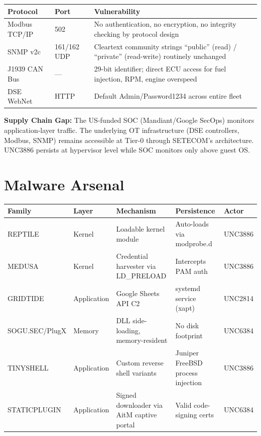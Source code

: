 \documentclass[11pt,a4paper]{article}
\begin{document}
\begin{tabularx}{\textwidth}{llX}
\toprule
\textbf{Protocol} & \textbf{Port} & \textbf{Vulnerability} \\
\midrule
Modbus TCP/IP & 502 & No authentication, no encryption, no integrity checking by protocol design \\
SNMP v2c & 161/162 UDP & Cleartext community strings ``public'' (read) / ``private'' (read-write) routinely unchanged \\
J1939 CAN Bus & — & 29-bit identifier; direct ECU access for fuel injection, RPM, engine overspeed \\
DSE WebNet & HTTP & Default Admin/Password1234 across entire fleet \\
\bottomrule
\end{tabularx}

\vspace{0.5em}
\textbf{Supply Chain Gap:} The US-funded SOC (Mandiant/Google SecOps) monitors application-layer traffic. The underlying OT infrastructure (DSE controllers, Modbus, SNMP) remains accessible at Tier-0 through SETECOM's architecture. UNC3886 persists at hypervisor level while SOC monitors only above guest OS.

\section{Malware Arsenal}

\begin{tabularx}{\textwidth}{llXXl}
\toprule
\textbf{Family} & \textbf{Layer} & \textbf{Mechanism} & \textbf{Persistence} & \textbf{Actor} \\
\midrule
REPTILE & Kernel & Loadable kernel module & Auto-loads via modprobe.d & UNC3886 \\
MEDUSA & Kernel & Credential harvester via LD\_PRELOAD & Intercepts PAM auth & UNC3886 \\
GRIDTIDE & Application & Google Sheets API C2 & systemd service (xapt) & UNC2814 \\
SOGU.SEC/PlugX & Memory & DLL side-loading, memory-resident & No disk footprint & UNC6384 \\
TINYSHELL & Application & Custom reverse shell variants & Juniper FreeBSD process injection & UNC3886 \\
STATICPLUGIN & Application & Signed downloader via AitM captive portal & Valid code-signing certs & UNC6384 \\
\bottomrule
\end{tabularx}
\end{document}
